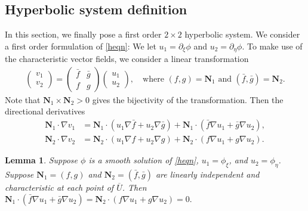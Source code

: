 \documentclass[11pt]{amsart}
\theoremstyle{plain}
\newtheorem{Lem}[Thm]{Lemma}
\theoremstyle{remark}
\numberwithin{equation}{section}
\numberwithin{Thm}{section}
\def\U{\overline{U}}
\def\N{{\mathbf N}}
\begin{document}
\subsection{Hyperbolic system definition} 
In this section, we finally pose a first order $2\times 2$ hyperbolic system. We consider a first order formulation of \eqref{heqn}: We let $u _1=\partial_\xi \phi$ and $u_2=\partial_\eta \phi$.
To make use of the characteristic vector fields, we consider a linear transformation
\begin{align} \label{formula}
 \begin{pmatrix} v_1 \\ v_2 \end{pmatrix} = \begin{pmatrix} \bar f & \bar g \\ f & g \end{pmatrix} \begin{pmatrix} u_1 \\ u_2 \end{pmatrix}, \quad \text{where $(f,g)=\N_1$ and  $(\bar f,\bar g)=\N_2$.}
\end{align}
Note that $\N_1\times\N_2>0$ gives the bijectivity of the transformation. 
Then the directional derivatives
\begin{equation} \label{pdev}
\begin{aligned}
   \N_1\cdot\nabla v_1 &= \N_1\cdot (u_1\nabla \bar{f}  + u_2\nabla \bar{g} ) + \N_1 \cdot (\bar{f}\nabla u_1  + \bar{g}\nabla u_2 ), \\
   \N_2\cdot\nabla v_2 &= \N_2\cdot (u_1\nabla {f}  + u_2\nabla {g} ) + \N_2 \cdot ({f}\nabla u_1  + {g}\nabla u_2 ).
\end{aligned}
\end{equation}
\begin{Lem} \label{lem:zero} Suppose $\phi$ is a smooth solution of \eqref{heqn}, $u_1 = \phi_\xi$, and $u_2=\phi_\eta$. Suppose $\N_1=({f},{g})$ and $\N_2=(\bar{f},\bar{g})$ are linearly independent and characteristic at each point of $\U$. Then $\N_1 \cdot (\bar{f}\nabla u_1  + \bar{g}\nabla u_2 ) = \N_2 \cdot ({f}\nabla u_1  + {g}\nabla u_2 )= 0.$
\end{Lem}
\end{document}
